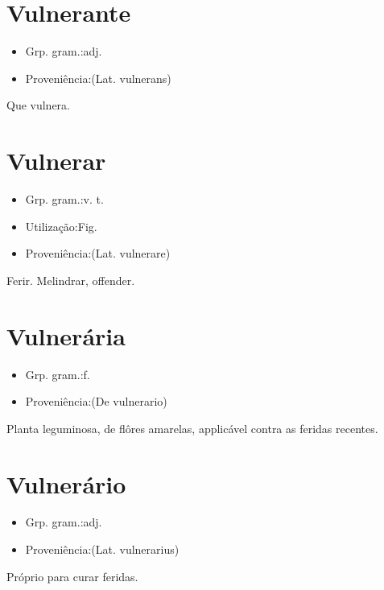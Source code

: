 \documentclass{article}
\begin{document}
\section{Vulnerante}
\begin{itemize}
\item {Grp. gram.:adj.}
\end{itemize}
\begin{itemize}
\item {Proveniência:(Lat. \textunderscore vulnerans\textunderscore )}
\end{itemize}
Que vulnera.
\section{Vulnerar}
\begin{itemize}
\item {Grp. gram.:v. t.}
\end{itemize}
\begin{itemize}
\item {Utilização:Fig.}
\end{itemize}
\begin{itemize}
\item {Proveniência:(Lat. \textunderscore vulnerare\textunderscore )}
\end{itemize}
Ferir.
Melindrar, offender.
\section{Vulnerária}
\begin{itemize}
\item {Grp. gram.:f.}
\end{itemize}
\begin{itemize}
\item {Proveniência:(De \textunderscore vulnerario\textunderscore )}
\end{itemize}
Planta leguminosa, de flôres amarelas, applicável contra as feridas recentes.
\section{Vulnerário}
\begin{itemize}
\item {Grp. gram.:adj.}
\end{itemize}
\begin{itemize}
\item {Proveniência:(Lat. \textunderscore vulnerarius\textunderscore )}
\end{itemize}
Próprio para curar feridas.
\end{document}
